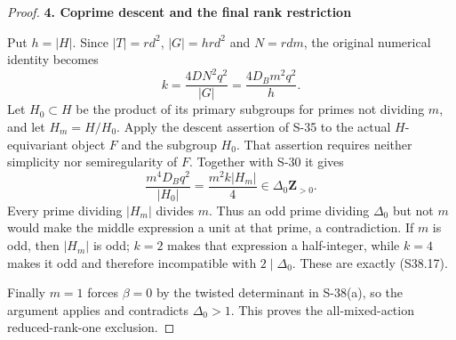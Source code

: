 \documentclass[11pt,a4paper]{article}
\theoremstyle{definition}
\begin{document}
\begin{proof}
\par

\medskip\noindent\textbf{4. Coprime descent and the final rank restriction}\quad

Put \(h=|H|\). Since \(|T|=rd^2\), \(|G|=hrd^2\) and \(N=rdm\), the original numerical identity becomes \[
 k=\frac{4DN^2q^2}{|G|}
   =\frac{4D_Bm^2q^2}{h}.
 \tag{S38.24}
\] Let \(H_0\subset H\) be the product of its primary subgroups for primes not dividing \(m\), and let \(H_m=H/H_0\). Apply the descent assertion of S-35 to the actual \(H\)-equivariant object \(F\) and the subgroup \(H_0\). That assertion requires neither simplicity nor semiregularity of \(F\). Together with S-30 it gives \[
 \frac{m^4D_Bq^2}{|H_0|}
   =\frac{m^2 k |H_m|}{4}
   \in\Delta_0\mathbf Z_{>0}.
 \tag{S38.25}
\] Every prime dividing \(|H_m|\) divides \(m\). Thus an odd prime dividing \(\Delta_0\) but not \(m\) would make the middle expression a unit at that prime, a contradiction. If \(m\) is odd, then \(|H_m|\) is odd; \(k=2\) makes that expression a half-integer, while \(k=4\) makes it odd and therefore incompatible with \(2\mid\Delta_0\). These are exactly (S38.17).

Finally \(m=1\) forces \(\beta=0\) by the twisted determinant in S-38(a), so the argument applies and contradicts \(\Delta_0>1\). This proves the all-mixed-action reduced-rank-one exclusion.
\end{proof}
\end{document}
